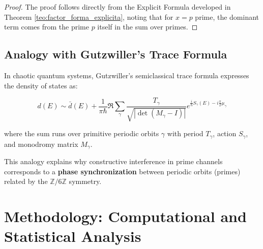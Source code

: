 \documentclass[12pt, a4paper]{article}
\theoremstyle{plain}
\theoremstyle{definition}
\theoremstyle{remark}
\begin{document}
\begin{proof}
The proof follows directly from the Explicit Formula developed in 
Theorem \ref{teo:factor_forma_explicita}, noting that for $x = p$ prime, the 
dominant term comes from the prime $p$ itself in the sum over primes.
\end{proof}

\subsection{Analogy with Gutzwiller's Trace Formula}
\label{subsec:gutzwiller_analogy}

In chaotic quantum systems, Gutzwiller's semiclassical trace formula 
expresses the density of states as:

\[
d(E) \sim \bar{d}(E) + \frac{1}{\pi\hbar} \Re \sum_{\gamma} \frac{T_\gamma}{\sqrt{|\det(M_\gamma - I)|}} 
e^{\frac{i}{\hbar}S_\gamma(E) - i\frac{\pi}{2}\mu_\gamma}
\]

where the sum runs over primitive periodic orbits $\gamma$ with period $T_\gamma$, 
action $S_\gamma$, and monodromy matrix $M_\gamma$.

\begin{center}
\end{center}

This analogy explains why constructive interference in prime channels 
corresponds to a \textbf{phase synchronization} between periodic orbits 
(primes) related by the $\mathbb{Z}/6\mathbb{Z}$ symmetry.

\section{Methodology: Computational and Statistical Analysis}
\label{sec:metodologia}
\end{document}
